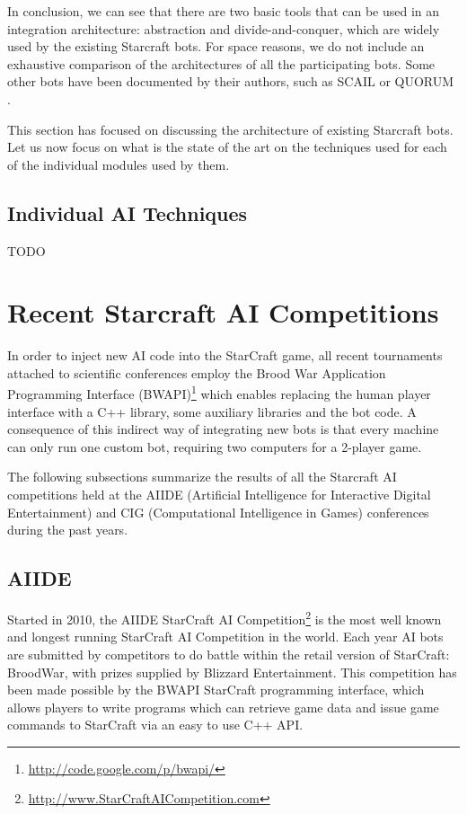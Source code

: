 \documentclass[journal]{IEEEtran}
\begin{document}
In conclusion, we can see that there are two basic tools that can be used in an integration architecture: abstraction and divide-and-conquer, which are widely used by the existing Starcraft bots. For space reasons, we do not include an exhaustive comparison of the architectures of all the participating bots. Some other bots have been documented by their authors, such as SCAIL \cite{YoungSCAIL} or QUORUM \cite{young2012evolutionary}.

This section has focused on discussing the architecture of existing Starcraft bots. Let us now focus on what is the state of the art on the techniques used for each of the individual modules used by them.

\subsection{Individual AI Techniques}\label{sec:techniques}

{\color{red} TODO}

\section{Recent Starcraft AI Competitions}\label{sec:competition}

In order to inject new AI code into the StarCraft game, all recent
tournaments attached to scientific conferences employ the 
Brood War Application Programming Interface 
(BWAPI)\footnote{\url{http://code.google.com/p/bwapi/}} which 
enables replacing the human player interface with a C++ library,
some auxiliary libraries and the bot code. A consequence of this
indirect way of integrating new bots is that every machine can
only run one custom bot, requiring two computers for a 2-player game.

The following subsections summarize the results of all the Starcraft AI competitions held at the AIIDE (Artificial Intelligence for Interactive Digital Entertainment) and CIG (Computational Intelligence in Games) conferences during the past years.

\subsection{AIIDE}\label{sec:AIIDE}

Started in 2010, the AIIDE StarCraft AI Competition\footnote{\url{http://www.StarCraftAICompetition.com}} is the most
well known and longest running StarCraft AI Competition in the world. Each year
AI bots are submitted by competitors to do battle within the retail version of
StarCraft: BroodWar, with prizes supplied by Blizzard Entertainment. This
competition has been made possible by the BWAPI StarCraft programming interface,
which allows players to write programs which can retrieve game data and issue
game commands to StarCraft via an easy to use C++ API.
\end{document}
